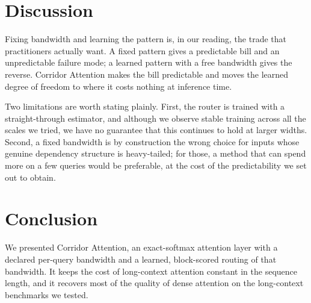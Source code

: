 \documentclass[11pt]{article}
\begin{document}
\section{Discussion}\label{sec:discussion}

Fixing bandwidth and learning the pattern is, in our reading, the trade that
practitioners actually want. A fixed pattern gives a predictable bill and an
unpredictable failure mode; a learned pattern with a free bandwidth gives the
reverse. Corridor Attention makes the bill predictable and moves the learned
degree of freedom to where it costs nothing at inference time.

Two limitations are worth stating plainly. First, the router is trained with a
straight-through estimator, and although we observe stable training across all
the scales we tried, we have no guarantee that this continues to hold at
larger widths. Second, a fixed bandwidth is by construction the wrong choice
for inputs whose genuine dependency structure is heavy-tailed; for those, a
method that can spend more on a few queries would be preferable, at the cost of
the predictability we set out to obtain.

\section{Conclusion}\label{sec:conclusion}

We presented Corridor Attention, an exact-softmax attention layer with a
declared per-query bandwidth and a learned, block-scored routing of that
bandwidth. It keeps the cost of long-context attention constant in the
sequence length, and it recovers most of the quality of dense
attention on the long-context benchmarks we tested.



\end{document}
